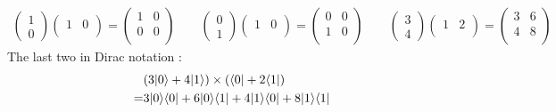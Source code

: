 \begin{align*}
\left(\begin{array}{c}
 1\\
 0
\end{array}\right)
\left(\begin{array}{cccc}
 1 &0 \\
\end{array}\right)
=
\left(\begin{array}{cccc}
 1 &0 \\
 0 &0 \\
\end{array}\right)
\qquad
\left(\begin{array}{c}
 0\\
 1
\end{array}\right)
\left(\begin{array}{cccc}
 1 &0 \\
\end{array}\right)
=
\left(\begin{array}{cccc}
 0 &0 \\
 1 &0 \\
\end{array}\right)
\qquad
\left(\begin{array}{c}
 3\\
 4
\end{array}\right)
\left(\begin{array}{cccc}
 1 &2 \\
\end{array}\right)
=
\left(\begin{array}{cccc}
 3 &6 \\
 4 &8 \\
\end{array}\right)
\end{align*}
The last two in Dirac notation :
\begin{align*}
  & (3| 0 \rangle + 4| 1 \rangle) \times (\langle 0 | + 2\langle 1 |) \\
  =& 3 | 0 \rangle \langle 0 | + 6 | 0 \rangle \langle 1 | + 4 | 1 \rangle \langle 0 | + 8 | 1 \rangle \langle 1 |
\end{align*}


